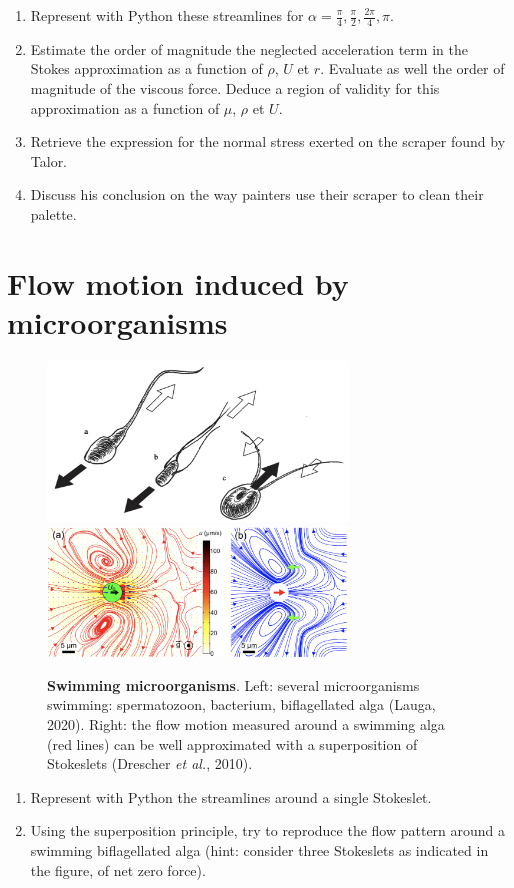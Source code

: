 \documentclass[11pt,a4paper]{article}
\begin{document}
\begin{enumerate}
\item Represent with Python these streamlines for $\alpha = \frac{\pi}{4}, \frac{\pi}{2}, \frac{2\pi}{4}, \pi$.
\item Estimate the order of magnitude the neglected acceleration term in the Stokes approximation as a function of $\rho$, $U$ et $r$. Evaluate as well the order of magnitude of the viscous force. Deduce a region of validity for this approximation as a function of $\mu$, $\rho$ et $U$.
\item Retrieve the expression for the normal stress exerted on the scraper found by Talor.
\item Discuss his conclusion on the way painters use their scraper to clean their palette.
\end{enumerate}

\section{Flow motion induced by microorganisms}
\begin{figure}[ht]
    \centering
    \includegraphics[width=8cm]{microorganisms.png}
    \includegraphics[width=8cm]{drescher.png}
    \caption{\textbf{Swimming microorganisms}. Left: several microorganisms swimming: spermatozoon, bacterium, biflagellated alga (Lauga, 2020). Right: the flow motion measured around a swimming alga (red lines) can be well approximated with a superposition of Stokeslets (Drescher \textit{et al.}, 2010).}
    \label{fig:microorg}
\end{figure}
\begin{enumerate}
\item Represent with Python the streamlines around a single Stokeslet.
\item Using the superposition principle, try to reproduce the flow pattern around a swimming biflagellated alga (hint: consider three Stokeslets as indicated in the figure, of net zero force).
\end{enumerate}
\end{document}
